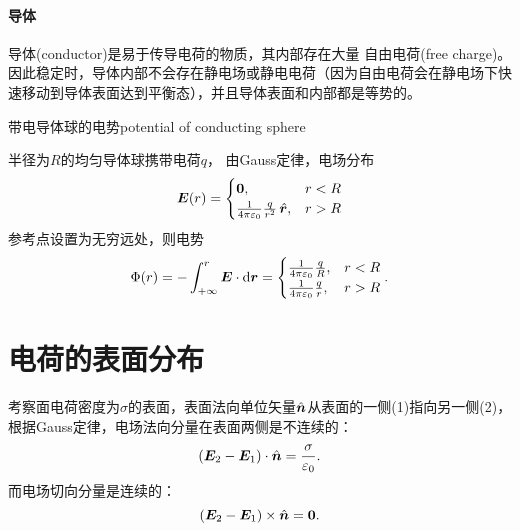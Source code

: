 \paragraph{导体}
导体(conductor)是易于传导电荷的物质，其内部存在大量%
自由电荷(free charge)。因此稳定时，导体内部不会存在静电场或静电电荷（因为自由电荷会在静电场下快速移动到导体表面达到平衡态），并且导体表面和内部都是等势的。
\begin{example}{带电导体球的电势}{potential of conducting sphere}

    半径为$R$的均匀导体球携带电荷$q$，%
    由Gauss定律，电场分布
    \[
        \bm E(r)=
        \begin{cases}
            \bm 0,&r<R\\
            \frac1{4\pi\varepsilon_0}\frac q{r^2}\mathop{}\!\hat{\bm{r}},&r>R
        \end{cases}
    \]
    参考点设置为无穷远处，则电势
    \[
        \Phi(r)=-\int_{+\infty}^r\bm E\cdot\mathop{}\!\mathrm{d}\bm r=
        \begin{cases}
            \frac1{4\pi\varepsilon_0}\frac qR,&r<R\\
            \frac1{4\pi\varepsilon_0}\frac qr,&r>R
        \end{cases}.
    \]
\end{example}

\section{电荷的表面分布}

考察面电荷密度为$\sigma$的表面，表面法向单位矢量$\mathop{}\!\hat{\bm{n}}$从表面的一侧(1)指向另一侧(2)，根据Gauss定律，电场法向分量在表面两侧是不连续的：
\begin{equation}
    \label{eqn:En2-En1}
    (\bm E_2-\bm E_1)\cdot\mathop{}\!\hat{\bm{n}}=\frac\sigma{\varepsilon_0}.
\end{equation}
而电场切向分量是连续的：
\begin{equation}
    (\bm E_2-\bm E_1)\times\mathop{}\!\hat{\bm{n}}=\bm 0.
\end{equation}

